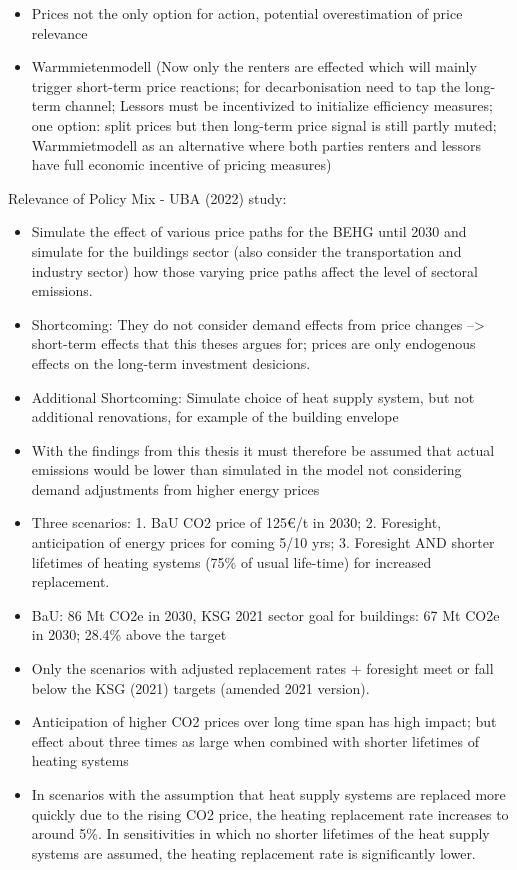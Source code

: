 \documentclass[12pt,twoside]{reedthesis}
\begin{document}
\begin{itemize}
\item
  Prices not the only option for action, potential overestimation of price relevance
\item
  Warmmietenmodell (Now only the renters are effected which will mainly trigger short-term price reactions; for decarbonisation need to tap the long-term channel; Lessors must be incentivized to initialize efficiency measures; one option: split prices but then long-term price signal is still partly muted; Warmmietmodell as an alternative where both parties renters and lessors have full economic incentive of pricing measures)
\end{itemize}
Relevance of Policy Mix - UBA (2022) study:
\begin{itemize}
\item
  Simulate the effect of various price paths for the BEHG until 2030 and simulate for the buildings sector (also consider the transportation and industry sector) how those varying price paths affect the level of sectoral emissions.
\item
  Shortcoming: They do not consider demand effects from price changes --\textgreater{} short-term effects that this theses argues for; prices are only endogenous effects on the long-term investment desicions.
\item
  Additional Shortcoming: Simulate choice of heat supply system, but not additional renovations, for example of the building envelope
\item
  With the findings from this thesis it must therefore be assumed that actual emissions would be lower than simulated in the model not considering demand adjustments from higher energy prices
\item
  Three scenarios: 1. BaU CO2 price of 125€/t in 2030; 2. Foresight, anticipation of energy prices for coming 5/10 yrs; 3. Foresight AND shorter lifetimes of heating systems (75\% of usual life-time) for increased replacement.
\item
  BaU: 86 Mt CO2e in 2030, KSG 2021 sector goal for buildings: 67 Mt CO2e in 2030; 28.4\% above the target
\item
  Only the scenarios with adjusted replacement rates + foresight meet or fall below the KSG (2021) targets (amended 2021 version).
\item
  Anticipation of higher CO2 prices over long time span has high impact; but effect about three times as large when combined with shorter lifetimes of heating systems
\item
  In scenarios with the assumption that heat supply systems are replaced more quickly due to the rising CO2 price, the heating replacement rate increases to around 5\%. In sensitivities in which no shorter lifetimes of the heat supply systems are assumed, the heating replacement rate is significantly lower.

\end{itemize}
\end{document}
